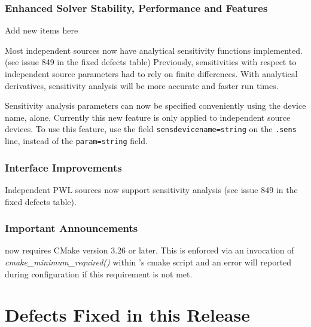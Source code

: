 \documentclass[letterpaper]{scrartcl}
\begin{document}
\subsubsection*{Enhanced Solver Stability, Performance and Features}
\begin{XyceItemize}
\item Add new items here
\item Most independent sources now have analytical sensitivity functions implemented. (see issue 849 in the fixed defects table)  Previously, sensitivities with respect to independent source parameters had to rely on finite differences.  With analytical derivatives, sensitivity analysis will be more accurate and faster run times.
  \item Sensitivity analysis parameters can now be specified conveniently using the device name, alone.  Currently this new feature is only applied to independent source devices.   To use this feature, use the field \texttt{sensdevicename=string} on the \texttt{.sens} line, instead of the \texttt{param=string} field.
\end{XyceItemize}

\subsubsection*{Interface Improvements}
\begin{XyceItemize}
\item Independent PWL sources now support sensitivity analysis (see issue 849 in the fixed defects table).
\end{XyceItemize}

\subsubsection*{Important Announcements}
\begin{XyceItemize}
  \item \Xyce{} now requires CMake version 3.26 or later. This is enforced via an invocation of \\
    \emph{cmake\_minimum\_required()} within \Xyce{}'s cmake script and an error will reported 
    during configuration if this requirement is not met.
\end{XyceItemize}

\newpage
\section{Defects Fixed in this Release}

\end{document}
